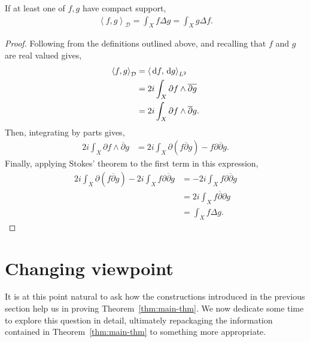 \begin{lemma}
	If at least one of $ f,g $ have compact support,
	\begin{align*}
		\left\langle f,g \right\rangle _{\mathcal{D}} = \int_{X}{f \Delta g} =
		\int_{X}{g \Delta f}.
	\end{align*}
	\begin{proof}
		Following from the definitions outlined above, and recalling that $ f $ and $
			g$ are real valued gives,
		\begin{align*}
			\left\langle f,g \right\rangle _{\mathcal{D}} & = \left\langle \operatorname{\, d\!}{f}, \operatorname{\, d\!}{g}
			\right\rangle _{L^2}                                                        \\
			                                              & = 2i \int_{X}{\partial f
				\wedge \overline{\partial
			g}}                                                                         \\
			                                              & = 2i \int_{X}{\partial f
				\wedge \overline{\partial }g}.
		\end{align*}
		Then, integrating by parts gives,
		\begin{align*}
			2i\int_{X}{\partial f \wedge \overline{\partial}g} & = 2i \int_{X}{\partial
				\left( f \overline{\partial}g \right) - f \partial
				\overline{\partial}g}.
		\end{align*}
		Finally, applying Stokes' theorem to the first term in this expression,
		\begin{align*}
			2i \int_{X}{\partial \left( f \overline{\partial}g \right)} - 2i
			\int_{X}{f\partial \overline{\partial}g} & = -2i \int_{X}{f \partial
			\overline{\partial}g}                                                \\
			                                         & = 2i \int_{X}{f
			\overline{\partial}\partial g}                                       \\
			                                         & = \int_{X}{f \Delta g}.
		\end{align*}
	\end{proof}
\end{lemma}

\section{Changing viewpoint}
It is at this point natural to ask how the constructions introduced in the
previous section help us in proving Theorem~\ref{thm:main-thm}. We now dedicate
some time to explore this question in detail, ultimately repackaging the
information contained in Theorem~\ref{thm:main-thm} to something more
appropriate.

